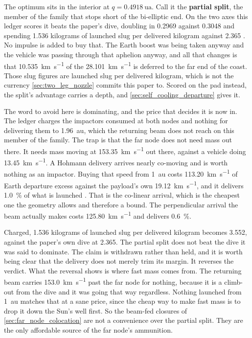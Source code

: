 \documentclass{article}
\begin{document}
The optimum sits in the interior at $q = \SI{0.4918}{\astronomicalunit}$. Call it the \textbf{partial split}, the member of the family that stops short of the bi-elliptic end. On the two axes this ledger scores it beats the paper's dive, doubling in \SI{0.2969}{\year} against \SI{0.3048}{\year} and spending \num{1.536} kilograms of launched slug per delivered kilogram against \num{2.365} \cite{Katz_aim_is_all_you_need_2025}. No impulse is added to buy that. The Earth boost was being taken anyway and the vehicle was passing through that aphelion anyway, and all that changes is that \SI{10.535}{\kilo\meter\per\second} of the \SI{28.101}{\kilo\meter\per\second} is deferred to the far end of the coast. Those slug figures are launched slug per delivered kilogram, which is not the currency \autoref{sec:two_leg_nozzle} commits this paper to. Scored on the pad instead, the split's advantage carries a depth, and \autoref{sec:self_cooling_departure} gives it.

The word to avoid here is dominating, and the price that decides it is now in. The ledger charges the impactors consumed at both nodes and nothing for delivering them to \SI{1.96}{\astronomicalunit}, which the returning beam does not reach on this member of the family. The trap is that the far node does not need mass out there. It needs mass moving at \SI{153.35}{\kilo\meter\per\second} out there, against a vehicle doing \SI{13.45}{\kilo\meter\per\second}. A Hohmann delivery arrives nearly co-moving and is worth nothing as an impactor. Buying that speed from \SI{1}{\astronomicalunit} costs \SI{113.20}{\kilo\meter\per\second} of Earth departure excess against the payload's own \SI{19.12}{\kilo\meter\per\second}, and it delivers \SI{1.0}{\percent} of what is launched \cite{Katz_aim_is_all_you_need_2025}. That is the co-linear arrival, which is the cheapest one the geometry allows and therefore a bound. The perpendicular arrival the beam actually makes costs \SI{125.80}{\kilo\meter\per\second} and delivers \SI{0.6}{\percent}.

Charged, \num{1.536} kilograms of launched slug per delivered kilogram becomes \num{3.552}, against the paper's own dive at \num{2.365}. The partial split does not beat the dive it was said to dominate. The claim is withdrawn rather than held, and it is worth being clear that the delivery does not merely trim its margin. It reverses the verdict. What the reversal shows is where fast mass comes from. The returning beam carries \SI{153.0}{\kilo\meter\per\second} past the far node for nothing, because it is a climb-out from the dive and it was going that way regardless. Nothing launched from \SI{1}{\astronomicalunit} matches that at a sane price, since the cheap way to make fast mass is to drop it down the Sun's well first. So the beam-fed closures of \autoref{sec:far_node_colocation} are not a convenience over the partial split. They are the only affordable source of the far node's ammunition.
\end{document}
